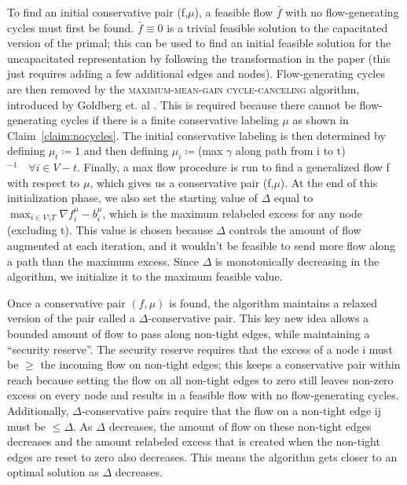 \documentclass[11pt]{article}
\theoremstyle{definition}
\theoremstyle{definition}
\theoremstyle{definition}
\newcommand{\fu}{f^{\mu}}
\newcommand{\nfiu}{\nabla \fu_i}
\newcommand{\biu}{b_{i}^{\mu}}
\begin{document}
To find an initial conservative pair (f,$\mu$), a feasible flow $\bar{f}$ with no flow-generating cycles must first be found. $\bar{f} \equiv 0$ is a trivial feasible solution to the capacitated version of the primal; this can be used to find an initial feasible solution for the uncapacitated representation by following the transformation in the paper \cite{article} (this just requires adding a few additional edges and nodes). Flow-generating cycles are then removed by the \textsc{maximum-mean-gain cycle-canceling} algorithm, introduced by Goldberg et. al \cite{Goldberg:1991:CAG:105014.105022}. This is required because there cannot be flow-generating cycles if there is a finite conservative labeling $\mu$ as shown in Claim~\ref{claim:nocycles}. The initial conservative labeling is then determined by defining $\mu_t \coloneqq 1$ and then defining $\mu_i \coloneqq$(max $\gamma$ along path from i to t)$^{-1} \quad \forall i \in V-t$. Finally, a max flow procedure is run to find a generalized flow f with respect to $\mu$, which gives us a conservative pair (f,$\mu$). At the end of this initialization phase, we also set the starting value of $\Delta$ equal to $\max_{i \in V\setminus T} \nfiu - \biu$, which is the maximum relabeled excess for any node (excluding t). This value is chosen because $\Delta$ controls the amount of flow augmented at each iteration, and it wouldn't be feasible to send more flow along a path than the maximum excess. Since $\Delta$ is monotonically decreasing in the algorithm, we initialize it to the maximum feasible value. 

Once a conservative pair $(f, \mu)$ is found, the algorithm maintains a relaxed version of the pair called a $\Delta$-conservative pair. This key new idea allows a bounded amount of flow to pass along non-tight edges, while maintaining a ``security reserve''. The security reserve requires that the excess of a node i must be $\geq$ the incoming flow on non-tight edges; this keeps a conservative pair within reach because setting the flow on all non-tight edges to zero still leaves non-zero excess on every node and results in a feasible flow with no flow-generating cycles. Additionally, $\Delta$-conservative pairs require that the flow on a non-tight edge ij must be $\leq \Delta$. As $\Delta$ decreases, the amount of flow on these non-tight edges decreases and the amount relabeled excess that is created when the non-tight edges are reset to zero also decreases. This means the algorithm gets closer to an optimal solution as $\Delta$ decreases.
\end{document}

